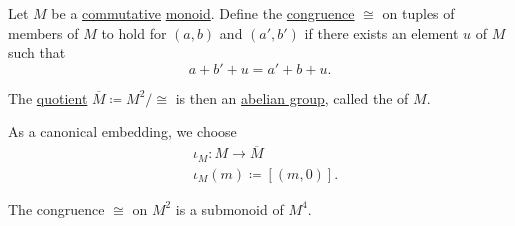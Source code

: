 \begin{definition}\label{def:monoid_grothendieck_completion}
  Let \( M \) be a \hyperref[def:binary_operation/commutative]{commutative} \hyperref[def:monoid]{monoid}. Define the \hyperref[def:first_order_congruence]{congruence} \( \cong \) on tuples of members of \( M \) to hold for \( (a, b) \) and \( (a', b') \) if there exists an element \( u \) of \( M \) such that
  \begin{equation*}
    a + b' + u = a' + b + u.
  \end{equation*}

  The \hyperref[def:first_order_quotient]{quotient} \( \overline M \coloneqq M^2 / {\cong} \) is then an \hyperref[def:abelian_group]{abelian group}, called the  of \( M \).

  As a canonical embedding, we choose
  \begin{equation*}
    \begin{aligned}
      &\iota_M: M \to \overline M \\
      &\iota_M(m) \coloneqq [(m, 0)].
    \end{aligned}
  \end{equation*}
\end{definition}
\begin{comments}
  \item The congruence \( {\cong} \) on \( M^2 \) is a submonoid of \( M^4 \).
\end{comments}
